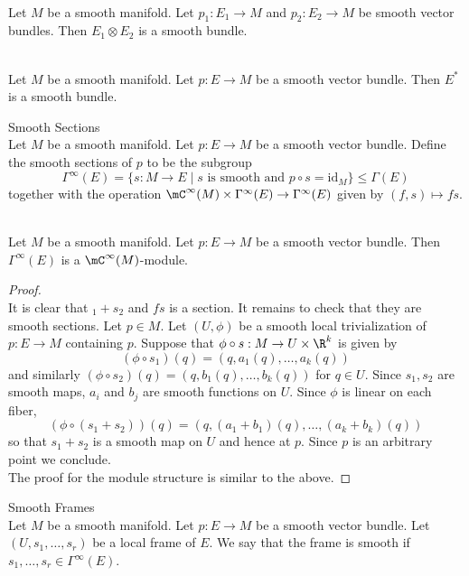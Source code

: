 \documentclass[a4paper]{article}
\begin{document}
\begin{prp}{}{}\\
Let $M$ be a smooth manifold. Let $p_1:E_1\to M$ and $p_2:E_2\to M$ be smooth vector bundles. Then $E_1\otimes E_2$ is a smooth bundle. 
\end{prp}

\begin{prp}{}{}\\
Let $M$ be a smooth manifold. Let $p:E\to M$ be a smooth vector bundle. Then $E^\ast$ is a smooth bundle. 
\end{prp}

\begin{defn}{Smooth Sections}{}\\
Let $M$ be a smooth manifold. Let $p:E\to M$ be a smooth vector bundle. Define the smooth sections of $p$ to be the subgroup $$\Gamma^\infty(E)=\{s:M\to E\;|\;s\text{ is smooth and }p\circ s=\text{id}_M\}\leq\Gamma(E)$$ together with the operation $\mC^\infty(M)\times\Gamma^\infty(E)\to\Gamma^\infty(E)$ given by $(f,s)\mapsto fs$. 
\end{defn}

\begin{prp}{}{}\\
Let $M$ be a smooth manifold. Let $p:E\to M$ be a smooth vector bundle. Then $\Gamma^\infty(E)$ is a $\mC^\infty(M)$-module. 
\begin{proof}\\
It is clear that $_1+s_2$ and $fs$ is a section. It remains to check that they are smooth sections. Let $p\in M$. Let $(U,\phi)$ be a smooth local trivialization of $p:E\to M$ containing $p$. Suppose that $\phi\circ s:M\to U\times\R^k$ is given by $$(\phi\circ s_1)(q)=(q,a_1(q),\dots,a_k(q))$$ and similarly $(\phi\circ s_2)(q)=(q,b_1(q),\dots,b_k(q))$ for $q\in U$. Since $s_1,s_2$ are smooth maps, $a_i$ and $b_j$ are smooth functions on $U$. Since $\phi$ is linear on each fiber, $$(\phi\circ(s_1+s_2))(q)=(q,(a_1+b_1)(q),\dots,(a_k+b_k)(q))$$ so that $s_1+s_2$ is a smooth map on $U$ and hence at $p$. Since $p$ is an arbitrary point we conclude. \\

The proof for the module structure is similar to the above. 
\end{proof}
\end{prp}

\begin{defn}{Smooth Frames}{}\\
Let $M$ be a smooth manifold. Let $p:E\to M$ be a smooth vector bundle. Let $(U,s_1,\dots,s_r)$ be a local frame of $E$. We say that the frame is smooth if $s_1,\dots,s_r\in\Gamma^\infty(E)$. 
\end{defn}
\end{document}
